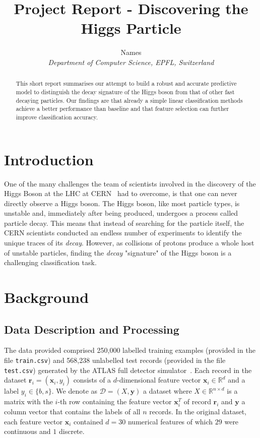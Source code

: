 \documentclass[10pt,conference,compsocconf]{IEEEtran}
\newcommand{\Data}{\mathcal{D}}
\newcommand{\features}{\mathbf{x}_i}
\newcommand{\target}{y_i}
\newcommand{\targetset}{\{ b, s \}}
\newcommand{\targetvector}{\mathbf{y}}
\begin{document}
\title{Project Report - Discovering the Higgs Particle}

\author{
  Names\\
  \textit{Department of Computer Science, EPFL, Switzerland}
}

\maketitle

\begin{abstract}
This short report summarises our attempt to build a robust and accurate predictive model to distinguish the decay signature of the Higgs boson from that of other fast decaying particles. Our findings are that already a simple linear classification methods achieve a better performance than baseline and that feature selection can further improve classification accuracy.
\end{abstract}


\section{Introduction}


One of the many challenges the team of scientists involved in the discovery of the Higgs Boson at the LHC at CERN~\cite{CERN} had to overcome, is that one can never directly observe a Higgs boson. The Higgs boson, like most particle types, is unstable and, immediately after being produced, undergoes a process called particle decay. This means that instead of searching for the particle itself, the CERN scientists conducted an endless number of experiments to identify the unique traces of its \emph{decay}. However, as collisions of protons produce a whole host of unstable particles, finding the \emph{decay} "signature" of the Higgs boson is a challenging classification task.\\

\section{Background}

\subsection{Data Description and Processing}
\label{sec:data}
The data provided comprised 250,000 labelled training examples (provided in the file \texttt{train.csv}) and 568,238 unlabelled test records (provided in the file \texttt{test.csv}) generated by the ATLAS full detector simulator~\cite{HiggsML}.
Each record in the dataset $\mathbf{r}_i = (\features, \target)$ consists of a $d$-dimensional feature vector $\features \in \mathbb{R}^d$ and a label $\target \in \targetset$. We denote as $\Data = (X, \targetvector)$ a dataset where $X \in \mathbb{R}^{n \times d}$ is a matrix with the $i$-th row containing the feature vector $\features^T$ of record $\mathbf{r}_i$ and $\targetvector$ a column vector that contains the labels of all $n$ records.       
In the original dataset, each feature vector $\features$ contained $d=30$ numerical features of which $29$ were continuous and $1$ discrete.  
\end{document}
